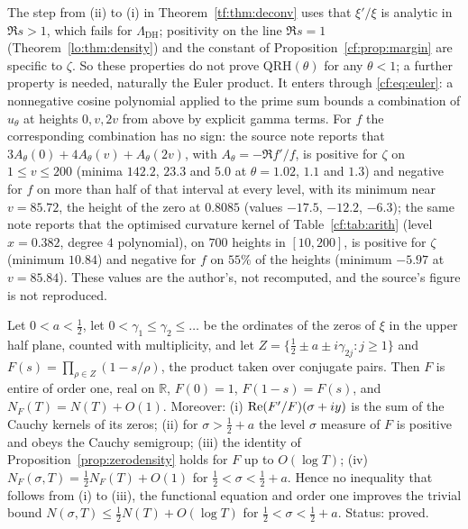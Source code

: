 The step from (ii) to (i) in Theorem~\ref{tf:thm:deconv} uses that $\xi'/\xi$ is analytic in $\Re s>1$, which fails for $\Lambda_{\mathrm{DH}}$; positivity on the line $\Re s=1$ (Theorem~\ref{lo:thm:density}) and the constant of Proposition~\ref{cf:prop:margin} are specific to $\zeta$. So these properties do not prove $\mathrm{QRH}(\theta)$ for any $\theta<1$; a further property is needed, naturally the Euler product. It enters through \eqref{cf:eq:euler}: a nonnegative cosine polynomial applied to the prime sum bounds a combination of $u_\theta$ at heights $0,v,2v$ from above by explicit gamma terms. For $f$ the corresponding combination has no sign: the source note reports that $3A_\theta(0)+4A_\theta(v)+A_\theta(2v)$, with $A_\theta=-\Re f'/f$, is positive for $\zeta$ on $1\le v\le200$ (minima $142.2$, $23.3$ and $5.0$ at $\theta=1.02$, $1.1$ and $1.3$) and negative for $f$ on more than half of that interval at every level, with its minimum near $v=85.72$, the height of the zero at $0.8085$ (values $-17.5$, $-12.2$, $-6.3$); the same note reports that the optimised curvature kernel of Table~\ref{cf:tab:arith} (level $x=0.382$, degree $4$ polynomial), on $700$ heights in $[10,200]$, is positive for $\zeta$ (minimum $10.84$) and negative for $f$ on $55\%$ of the heights (minimum $-5.97$ at $v=85.84$). These values are the author's, not recomputed, and the source's figure is not reproduced.

\begin{proposition}[the zero side alone allows $N(\sigma,T)=\frac12N(T)$]\label{cf:prop:half}
Let $0<a<\frac12$, let $0<\gamma_1\le\gamma_2\le\dots$ be the ordinates of the zeros of $\xi$ in the upper half plane, counted with multiplicity, and let $Z=\{\frac12\pm a\pm i\gamma_{2j}:j\ge1\}$ and $F(s)=\prod_{\rho\in Z}(1-s/\rho)$, the product taken over conjugate pairs. Then $F$ is entire of order one, real on $\mathbb R$, $F(0)=1$, $F(1-s)=F(s)$, and $N_F(T)=N(T)+O(1)$. Moreover: (i) $\operatorname{Re}(F'/F)(\sigma+iy)$ is the sum of the Cauchy kernels of its zeros; (ii) for $\sigma>\frac12+a$ the level $\sigma$ measure of $F$ is positive and obeys the Cauchy semigroup; (iii) the identity of Proposition~\ref{prop:zerodensity} holds for $F$ up to $O(\log T)$; (iv) $N_F(\sigma,T)=\frac12N_F(T)+O(1)$ for $\frac12<\sigma<\frac12+a$. Hence no inequality that follows from (i) to (iii), the functional equation and order one improves the trivial bound $N(\sigma,T)\le\frac12N(T)+O(\log T)$ for $\frac12<\sigma<\frac12+a$. Status: proved.
\end{proposition}

